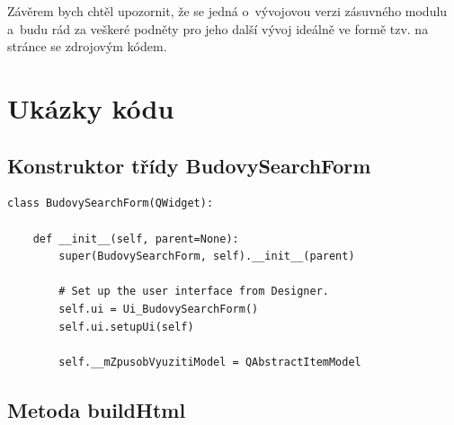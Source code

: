 \documentclass[a4paper,12pt,oneside]{book}
\begin{document}
Závěrem bych chtěl upozornit, že se jedná o~vývojovou verzi zásuvného
modulu a~budu rád za veškeré podněty pro jeho další vývoj ideálně ve formě
tzv.  na stránce se zdrojovým kódem.



\clearpage
\rhead{{\rightmark}}	%
\renewcommand{\refname}{Použitá literatura}



\clearpage
\listoffigures

\clearpage
\listoftables

\clearpage
\lstlistoflistings

\newpage
\appendix

\setcounter{page}{1}   	%

\chapter{Ukázky kódu}

\section{Konstruktor třídy BudovySearchForm}

{\scriptsize
\begin{lstlisting}[style=python, label=l_budovySearchForm_konstruktor]
class BudovySearchForm(QWidget):

    def __init__(self, parent=None):
        super(BudovySearchForm, self).__init__(parent)

        # Set up the user interface from Designer.
        self.ui = Ui_BudovySearchForm()
        self.ui.setupUi(self)

        self.__mZpusobVyuzitiModel = QAbstractItemModel
\end{lstlisting}
}

\section{Metoda buildHtml}
\end{document}
